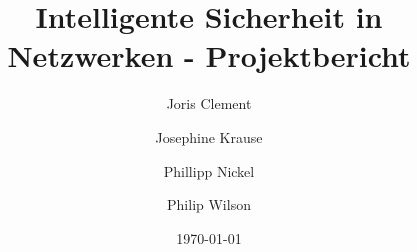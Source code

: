 \documentclass[a4paper, 12pt]{article}
\title{Intelligente Sicherheit in Netzwerken - Projektbericht}
\author{Joris Clement
\and Josephine Krause
\and Phillipp Nickel
\and Philip Wilson}
\date{\today}
\begin{document}
\maketitle


\begin{abstract}

\end{abstract}

\newpage

\tableofcontents
\newpage






\newpage






\newpage
\end{document}
